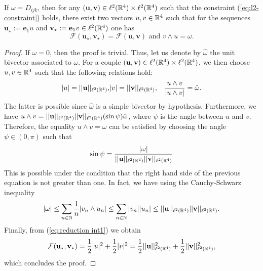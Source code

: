 \begin{proposition}
\label{prop:simple reduction}
If $\omega = D_{ijk}$, then for any $(\mathbf{u}, \mathbf{v}) \in \ell^2(\mathbb{R}^4) \times \ell^2(\mathbb{R}^4)$ such that the constraint (\ref{eq:l2-constraint}) holds, there exist two vectors $u, v \in \mathbb{R}^4$ such that for the sequences $\mathbf{u_\star} := \mathbf{e}_1 u$ and $\mathbf{v_\star} := \mathbf{e}_1 v \in \ell^2(\mathbb{R}^4)$ one has
\begin{equation}
\mathcal{F}(\mathbf{u_{\star}}, \mathbf{v_{\star}}) = \mathcal{F}(\mathbf{u}, \mathbf{v}) \text{ and } v \wedge u = \omega.
\end{equation}
\end{proposition}

\begin{proof}
If $\omega = 0$, then the proof is trivial. Thus, let us denote by $\hat{\omega}$ the unit bivector associated to $\omega$. For a couple $(\mathbf{u}, \mathbf{v}) \in \ell^2(\mathbb{R}^4) \times \ell^2(\mathbb{R}^4)$, we then choose $u,v \in \mathbb{R}^4$ such that the following relations hold:
\begin{eqnarray}
\label{eq:reduction int1}
	|u| = ||\mathbf{u} ||_{\ell^2(\mathbb{R}^4)}, &  |v| = ||\mathbf{v} ||_{\ell^2(\mathbb{R}^4)} , & \frac{u \wedge v}{|u \wedge v|} = \hat{\omega}.
\end{eqnarray}
The latter is possible since $\hat{\omega}$ is a simple bivector by hypothesis. Furthermore, we have $u \wedge v = ||\mathbf{u}||_{\ell^2(\mathbb{R}^4)} ||\mathbf{v}||_{\ell^2(\mathbb{R}^4)} (\sin\psi)\hat{\omega}$, where $\psi$ is the angle between $u$ and $v$. Therefore, the equality $u \wedge v = \omega$ can be satisfied by choosing the angle $\psi \in (0, \pi)$ such that
\begin{equation}
 \sin \psi = \frac{|\omega|}{||\mathbf{u}||_{\ell^2(\mathbb{R}^4)} ||\mathbf{v} ||_{\ell^2(\mathbb{R}^4)}}
 \end{equation}
This is possible under the condition that the right hand side  of the previous equation is not greater than one. In fact, we have using the Cauchy-Schwarz inequality
\begin{equation}
|\omega| \leq \sum_{n \in \mathbb{N}} \frac{1}{n} |v_n \wedge u_n| \leq \sum_{n \in \mathbb{N}} |v_n| |u_n| \leq ||\mathbf{u} ||_{\ell^2(\mathbb{R}^4)} ||\mathbf{v} ||_{\ell^2(\mathbb{R}^4)}.
\end{equation}
Finally, from (\ref{eq:reduction int1}) we obtain
\begin{equation}
\mathcal{F}(\mathbf{u_\star}, \mathbf{v_{\star}}) = \frac{1}{2} |u|^2 + \frac{1}{2} |v|^2 = \frac{1}{2} ||\mathbf{u}||_{\ell^2(\mathbb{R}^4)}^2 + \frac{1}{2} ||\textbf{v}||_{\ell^2(\mathbb{R}^4)}^2,
\end{equation}
which concludes the proof.
\end{proof}

